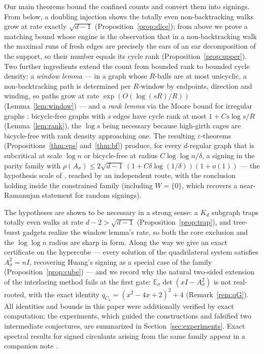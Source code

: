 \documentclass[11pt]{article}
\theoremstyle{remark}
\begin{document}
Our main theorems bound the confined counts and convert them into
signings. From below, a doubling injection shows the totally even
non-backtracking walks grow at rate exactly $\sqrt{d-1}$
(Proposition~\ref{prop:slice}); from above we prove a matching bound
whose engine is the observation that in a non-backtracking walk the
maximal runs of fresh edges are precisely the ears of an ear
decomposition of the support, so their number equals its cycle rank
(Proposition~\ref{prop:upper}). Two further ingredients extend the
count from bounded rank to bounded cycle density: a \emph{window
lemma} --- in a graph whose $R$-balls are at most unicyclic, a
non-backtracking path is determined per $R$-window by endpoints,
direction and winding, so paths grow at rate $\exp(O(\log(sR)/R))$
(Lemma~\ref{lem:window}) --- and a \emph{rank lemma} via the Moore
bound for irregular graphs \cite{ahl02}: bicycle-free graphs with $s$
edges have cycle rank at most $1+Cs\log s/R$
(Lemma~\ref{lem:rank}), the $\log s$ being necessary because
high-girth cages are bicycle-free with rank density approaching one.
The resulting $\varepsilon$-theorems
(Propositions~\ref{thm:eps} and~\ref{thm:bf}) produce, for every
$d$-regular graph that is subcritical at scale $\log n$ or
bicycle-free at radius $C\log\log n/\delta$, a signing in the parity
family with
$\rho(A_\sigma)\le2\sqrt{d-1}\,(1+C\delta\log(1/\delta))(1+o(1))$ ---
the hypothesis scale of \cite{mop20}, reached by an independent route,
with the conclusion holding inside the constrained family (including
$W=\{0\}$, which recovers a near-Ramanujan statement for random
signings).

The hypotheses are shown to be necessary in a strong sense: a $K_d$
subgraph traps totally even walks at rate $d-2>\sqrt{d-1}$
(Proposition~\ref{prop:trap}), and tree-burst gadgets realize the
window lemma's rate, so both the core exclusion and the
$\log\log n$ radius are sharp in form. Along the way we give an exact
certificate on the hypercube --- every solution of the quadrilateral
system satisfies $A_\sigma^2=nI$, recovering Huang's signing
\cite{huang19} as a special case of the family
(Proposition~\ref{prop:cube}) --- and we record why the natural
two-sided extension of the interlacing method fails at the first
gate: $\mathbb E_\sigma\det(xI-A_\sigma^2)$ is not real-rooted, with
the exact identity $q_{C_4}=(x^2-4x+2)^2+4$
(Remark~\ref{rem:qG}). All identities and bounds in this paper were
additionally verified by exact computation; the experiments, which
guided the constructions and falsified two intermediate conjectures,
are summarized in Section~\ref{sec:experiments}. Exact spectral
results for signed circulants arising from the same family appear in
a companion note \cite{companion}.
\end{document}

